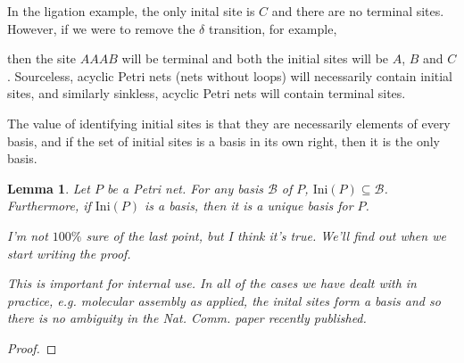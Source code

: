 \documentclass[aps,prd,onecolumn,nofootinbib,letterpaper,preprintnumbers,superscriptaddress,eqsecnum]{revtex4}
\newtheorem{lemma}{Lemma}
\theoremstyle{definition}
\newcommand{\B}{\mathcal{B}}
\newcommand{\Ini}[1]{\textrm{Ini}(#1)}
\newcommand{\red}[1]{{\color{red}#1}}
\newcommand{\green}[1]{{\color{ForestGreen}#1}}
\newcommand{\TODO}[1]{\noindent\red{\textbf{TODO:}~#1}}
\begin{document}
In the ligation example, the only inital site is $C$ and there are no terminal sites.
However, if we were to remove the $\delta$ transition, for example,
\begin{center}
\end{center}
then the site $AAAB$ will be terminal and both the initial sites will be $A$, $B$ and $C$.
Sourceless, acyclic Petri nets (nets without loops) will necessarily contain initial sites, and similarly sinkless, acyclic Petri nets will contain terminal sites.

The value of identifying initial sites is that they are necessarily elements of every basis, and if the set of initial sites is a basis in its own right, then it is the only basis.
\begin{lemma}\label{lem:initial-are-basic}
    Let $P$ be a Petri net.
    For any basis $\B$ of $P$, $\Ini{P} \subseteq \B$.
    Furthermore, if $\Ini{P}$ is a basis, then it is a unique basis for $P$.

    \red{I'm not $100\%$ sure of the last point, but I think it's true. We'll find out when we start writing the proof.}

    \green{This is important for internal use. In all of the cases we have dealt with in practice, e.g. molecular assembly as applied, the inital sites form a basis and so there is no ambiguity in the Nat. Comm. paper recently published.}
\end{lemma}
\begin{proof}
    \TODO{Complete}
\end{proof}
\end{document}
